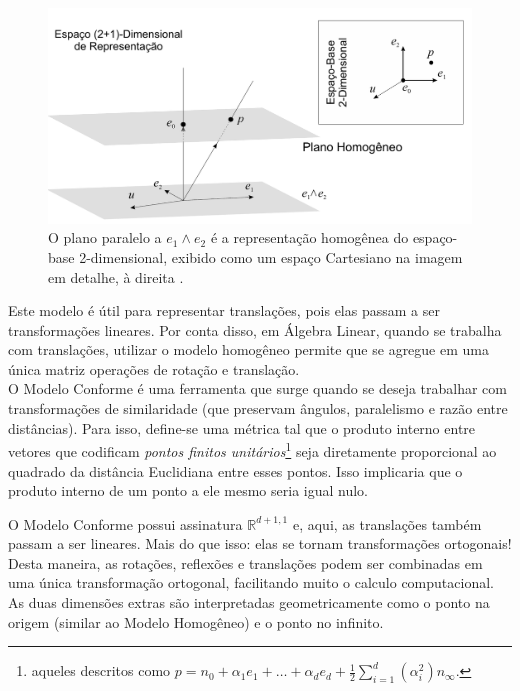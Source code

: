 \documentclass[11pt]{article}
\begin{document}
\begin{figure}[H]
	\begin{center}
		\includegraphics[width=0.75\linewidth]{figures/homogeneo.png}
	\end{center}
	\caption{O plano paralelo a $e_1\wedge e_2$ é a representação homogênea do espaço-base 2-dimensional, exibido como um espaço Cartesiano na imagem em detalhe, à direita \cite{leandro2017algebra}.}
	\label{fig:homogeneo}
\end{figure}

Este modelo é útil para representar translações, pois elas passam a ser transformações lineares. Por conta disso, em Álgebra Linear, quando se trabalha com translações, utilizar o modelo homogêneo permite que se agregue em uma única matriz operações de rotação e translação.
\\

O Modelo Conforme é uma ferramenta que surge quando se deseja trabalhar com transformações de similaridade (que preservam ângulos, paralelismo e razão entre distâncias). Para isso, define-se uma métrica tal que o produto interno entre vetores que codificam \textit{pontos finitos unitários}\footnote{aqueles descritos como $p =n_0 + \alpha_1e_1 + \dots + \alpha_de_d + \frac{1}{2} \sum_{i=1}^{d}(\alpha_i^2)n_\infty$.} seja diretamente proporcional ao quadrado da distância Euclidiana entre esses pontos. Isso implicaria que o produto interno de um ponto a ele mesmo seria igual nulo.

O Modelo Conforme possui assinatura $\mathbb{R}^{d+1,1}$ e, aqui, as translações também passam a ser lineares. Mais do que isso: elas se tornam transformações ortogonais! Desta maneira, as rotações, reflexões e translações podem ser combinadas em uma única transformação ortogonal, facilitando muito o calculo computacional. As duas dimensões extras são interpretadas geometricamente como o ponto na origem (similar ao Modelo Homogêneo) e o ponto no infinito. 
\end{document}
